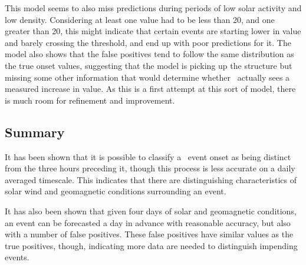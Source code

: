 This model seems to also miss predictions during periods of low solar activity and low density. Considering at least one value had to be less than 20, and one greater than 20, this might indicate that certain events are starting lower in value and barely crossing the threshold, and end up with poor predictions for it.  The model also shows that the false positives tend to follow the same distribution as the true onset values, suggesting that the model is picking up the structure but missing some other information that would determine whether \req\ actually sees a measured increase in value. As this is a first attempt at this sort of model, there is much room for refinement and improvement.

\subsection{Summary}
It has been shown that it is possible to classify a \req\ event onset as being distinct from the three hours preceding it, though this process is less accurate on a daily averaged timescale. This indicates that there are distinguishing characteristics of solar wind and geomagnetic conditions surrounding an event.

It has also been shown that given four days of solar and geomagnetic conditions, an event can be forecasted a day in advance with reasonable accuracy, but also with a number of false positives. These false positives have similar values as the true positives, though, indicating more data are needed to distinguish impending events.


